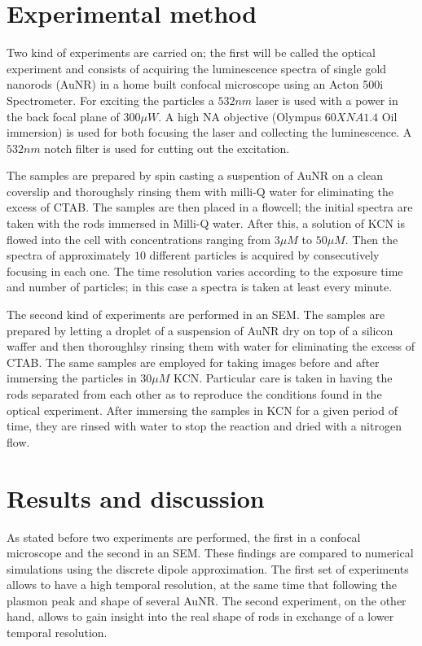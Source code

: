 \documentclass[twocolumn]{article}
\begin{document}
\section{Experimental method}
Two kind of experiments are carried on; the first will be called the optical
experiment and consists of acquiring the luminescence spectra of single gold
nanorods (AuNR) in a home built confocal microscope using an Acton 500i
Spectrometer. For exciting the particles a $532nm$ laser is used with a power
in the back focal plane of $300\mu W$. A high NA objective (Olympus $60X NA 1.4$
Oil immersion) is used for both focusing the laser and collecting the
luminescence. A $532nm$ notch filter is used for cutting out the excitation.

The samples are prepared by spin casting a suspention of AuNR on a clean
coverslip and thoroughsly rinsing them  with milli-Q water for eliminating the
excess of CTAB. The samples are then placed in a flowcell; the initial spectra
are taken with the rods immersed in Milli-Q water. After this, a solution of
KCN is flowed into the cell with concentrations ranging from $3\mu M$ to $50\mu
M$. Then the spectra of approximately $10$ different particles is
acquired by consecutively focusing in each one. The time resolution varies
according to the exposure time and number of particles; in this case a spectra
is taken at least every minute.

The second kind of experiments are performed in an SEM. The samples
are prepared by letting a droplet of a suspension of AuNR dry on top of a
silicon waffer and then thoroughlsy rinsing them with water for eliminating the
excess of CTAB. The same samples are employed for taking images before and after
immersing the particles in $30\mu M$ KCN. Particular care is taken in having the
rods separated from each other as to reproduce the conditions found in the
optical experiment. After immersing the samples in KCN for a given period of
time, they are rinsed with water to stop the reaction and dried with a nitrogen
flow.

\section{Results and discussion}
As stated before two experiments are performed, the first in a
confocal microscope and the second in an SEM. These findings are compared to
numerical simulations using the discrete dipole approximation. The first set of
experiments allows to have a high temporal resolution, at the same time that
following the plasmon peak and shape of several AuNR. The second experiment, on
the other hand, allows to gain insight into the real shape of rods in exchange
of a lower temporal resolution. 
\end{document}
